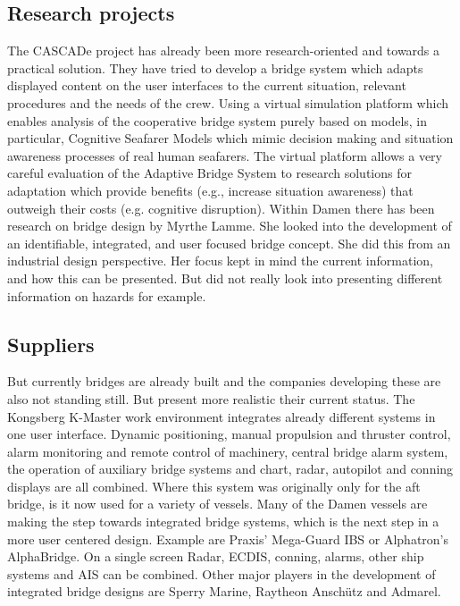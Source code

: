 \subsection{Research projects}
The CASCADe project has already been more research-oriented and towards a practical solution. They have tried to develop a bridge system which adapts displayed content on the user interfaces to the current situation, relevant procedures and the needs of the crew. Using a virtual simulation platform which enables analysis of the cooperative bridge system purely based on models, in particular, Cognitive Seafarer Models which mimic decision making and situation awareness processes of real human seafarers. The virtual platform allows a very careful evaluation of the Adaptive Bridge System to research solutions for adaptation which provide benefits (e.g., increase situation awareness) that outweigh their costs (e.g. cognitive disruption).\cite{CASCADe2015}
Within Damen there has been research on bridge design by Myrthe Lamme. She looked into the development of an identifiable, integrated, and user focused bridge concept. She did this from an industrial design perspective. Her focus kept in mind the current information, and how this can be presented. But did not really look into presenting different information on hazards for example.


\subsection{Suppliers}
But currently bridges are already built and the companies developing these are also not standing still. But present more realistic their current status. The Kongsberg K-Master work environment integrates already different systems in one user interface. Dynamic positioning, manual propulsion and thruster control, alarm monitoring and remote control of machinery, central bridge alarm system, the operation of auxiliary bridge systems and chart, radar, autopilot and conning displays are all combined. Where this system was originally only for the aft bridge, is it now used for a variety of vessels. \cite{Kongsberg2017}
Many of the Damen vessels are making the step towards integrated bridge systems, which is the next step in a more user centered design. Example are Praxis' Mega-Guard IBS or Alphatron's AlphaBridge. On a single screen Radar, ECDIS, conning, alarms, other ship systems and AIS can be combined. 
Other major players in the development of integrated bridge designs are Sperry Marine, Raytheon Anschütz and Admarel.

